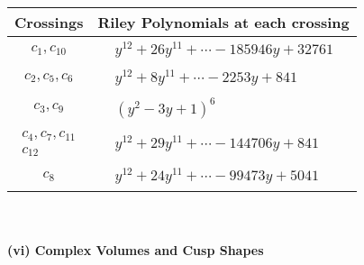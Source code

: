 \documentclass[1p]{elsarticle_modified}
\theoremstyle{definition}
\begin{document}
\begin{tabular}{m{50pt}|m{274pt}}
Crossings & \hspace{64pt}Riley Polynomials at each crossing \\
\hline $$\begin{aligned}c_{1},c_{10}\end{aligned}$$&$\begin{aligned}
&y^{12}+26 y^{11}+\cdots-185946 y+32761
\end{aligned}$\\
\hline $$\begin{aligned}c_{2},c_{5},c_{6}\end{aligned}$$&$\begin{aligned}
&y^{12}+8 y^{11}+\cdots-2253 y+841
\end{aligned}$\\
\hline $$\begin{aligned}c_{3},c_{9}\end{aligned}$$&$\begin{aligned}
&(y^2-3 y+1)^6
\end{aligned}$\\
\hline $$\begin{aligned}c_{4},c_{7},c_{11}\\c_{12}\end{aligned}$$&$\begin{aligned}
&y^{12}+29 y^{11}+\cdots-144706 y+841
\end{aligned}$\\
\hline $$\begin{aligned}c_{8}\end{aligned}$$&$\begin{aligned}
&y^{12}+24 y^{11}+\cdots-99473 y+5041
\end{aligned}$\\
\hline
\end{tabular}\\~\\
\newpage\flushleft \textbf{(vi) Complex Volumes and Cusp Shapes}
\end{document}

